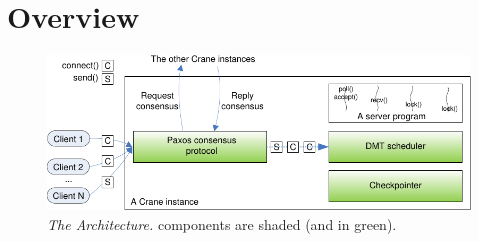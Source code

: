 \section{Overview} \label{sec:arch}

\begin{figure}[t]
\vspace{.20in}
\centering
\includegraphics[width=.5\textwidth]{figures/arch}
\vspace{-.20in}
\caption{{\em The \xxx Architecture.} \xxx components are shaded (and in
  green).} \label{fig:arch}
\vspace{-.05in}
\end{figure}

